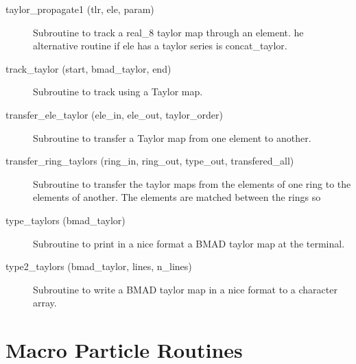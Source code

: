 \begin{description}
\item[taylor\_propagate1 (tlr, ele, param)] \Newline
Subroutine to track a real\_8 taylor map through an element. 
he alternative routine if ele has a taylor series is concat\_taylor. 

\item[track\_taylor (start, bmad\_taylor, end)] \Newline
Subroutine to track using a Taylor map. 

\item[transfer\_ele\_taylor (ele\_in, ele\_out, taylor\_order)] \Newline 
     Subroutine to transfer a Taylor map from one element to another.

\item[transfer\_ring\_taylors (ring\_in, ring\_out, 
                                             type\_out, transfered\_all) ] \Newline 
     Subroutine to transfer the taylor maps from the elements of one ring to
     the elements of another. The elements are matched between the rings so 

\item[type\_taylors (bmad\_taylor)] \Newline
Subroutine to print in a nice format a BMAD taylor map at the terminal. 

\item[type2\_taylors (bmad\_taylor, lines, n\_lines)] \Newline
Subroutine to write a BMAD taylor map in a nice format to a character array. 

\end{description}

\section{Macro Particle Routines}
\label{r:macro}    

